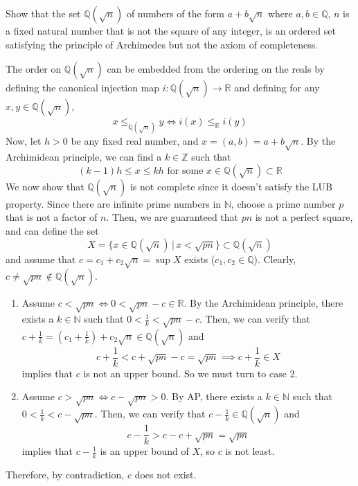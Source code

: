   \begin{exercise}[Zorich 2.2.21]
    Show that the set $\mathbb{Q}(\sqrt{n})$ of numbers of the form $a + b \sqrt{n}$ where $a, b \in \mathbb{Q}$, $n$ is a fixed natural number that is not the square of any integer, is an ordered set satisfying the principle of Archimedes but not the axiom of completeness. 
  \end{exercise}
  \begin{solution}
    The order on $\mathbb{Q}(\sqrt{n})$ can be embedded from the ordering on the reals by defining the canonical injection map $i:\mathbb{Q}(\sqrt{n}) \longrightarrow \mathbb{R}$ and defining for any $x, y \in \mathbb{Q}(\sqrt{n})$, 
    \begin{equation}
      x \leq_{\mathbb{Q}(\sqrt{n})} y \iff i(x) \leq_{\mathbb{R}} i(y)
    \end{equation}
    Now, let $h > 0$ be any fixed real number, and $x = (a,b) = a + b\sqrt{n}$. By the Archimidean principle, we can find a $k \in \mathbb{Z}$ such that
    \begin{equation}
      (k - 1) h \leq x \leq k h \text{ for some } x \in \mathbb{Q}(\sqrt{n}) \subset \mathbb{R}
    \end{equation}
    We now show that $\mathbb{Q}(\sqrt{n})$ is not complete since it doesn't satisfy the LUB property. Since there are infinite prime numbers in $\mathbb{N}$, choose a prime number $p$ that is not a factor of $n$. Then, we are guaranteed that $pn$ is not a perfect square, and can define the set 
    \begin{equation}
      X = \{x \in \mathbb{Q}(\sqrt{n})\,|\, x < \sqrt{pn} \} \subset \mathbb{Q}(\sqrt{n})
    \end{equation}
    and assume that $c = c_1 + c_2 \sqrt{n} = \sup{X}$ exists ($c_1, c_2 \in \mathbb{Q}$). Clearly, $c \neq \sqrt{pn} \not\in \mathbb{Q}(\sqrt{n})$. 
    \begin{enumerate}
      \item Assume $c < \sqrt{pn} \iff 0 < \sqrt{pn} - c \in \mathbb{R}$. By the Archimidean principle, there exists a $k \in \mathbb{N}$ such that $0 < \frac{1}{k} < \sqrt{pn} - c $. Then, we can verify that $c + \frac{1}{k} = (c_1 + \frac{1}{k}) + c_2 \sqrt{n} \in \mathbb{Q}(\sqrt{n})$ and 
      \begin{equation}
        c + \frac{1}{k} < c + \sqrt{pn} - c = \sqrt{pn} \implies c + \frac{1}{k} \in X
      \end{equation}
      implies that $c$ is not an upper bound. So we must turn to case 2. 
      \item Assume $c > \sqrt{pn} \iff c - \sqrt{pn} > 0$. By AP, there exists a $k \in \mathbb{N}$ such that $0 < \frac{1}{k} < c - \sqrt{pn}$. Then, we can verify that $c - \frac{1}{k} \in \mathbb{Q}(\sqrt{n})$ and 
      \begin{equation}
        c - \frac{1}{k} > c - c + \sqrt{pn} = \sqrt{pn}
      \end{equation}
      implies that $c - \frac{1}{k}$ is an upper bound of $X$, so $c$ is not least. 
    \end{enumerate}
    Therefore, by contradiction, $c$ does not exist. 
  \end{solution}

